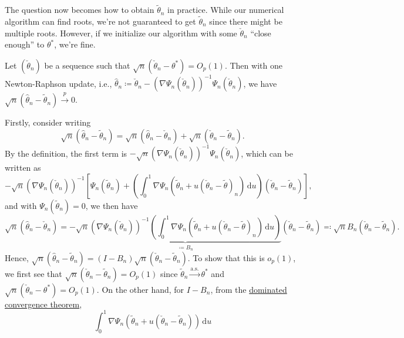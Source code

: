 The question now becomes how to obtain \(\widetilde{\theta} _n\) in practice. While our numerical algorithm can find roots, we're not guaranteed to get \(\widetilde{\theta} _n\) since there might be multiple roots. However, if we initialize our algorithm with some \(\check{\theta }_n\) ``close enough'' to \(\theta ^{\ast} \), we're fine.

\begin{claim}
	Let \((\check{\theta }_n)\) be a sequence such that \(\sqrt{n} (\check{\theta }_n - \theta ^{\ast} ) = O_p(1) \). Then with one Newton-Raphson update, i.e., \(\hat{\theta} _n \coloneqq \check{\theta }_n - \left( \nabla \Psi _n(\check{\theta }_n) \right) ^{-1} \Psi _n(\check{\theta }_n)\), we have \(\sqrt{n} (\hat{\theta} _n - \widetilde{\theta} _n) \overset{p}{\to} 0\).
\end{claim}
\begin{explanation}
	Firstly, consider writing
	\[
		\sqrt{n} (\hat{\theta} _n - \widetilde{\theta} _n)
		= \sqrt{n} (\hat{\theta} _n - \check{\theta }_n) + \sqrt{n} (\check{\theta }_n - \widetilde{\theta} _n).
	\]
	By the definition, the first term is \(- \sqrt{n} \left( \nabla \Psi _n(\check{\theta }_n) \right) ^{-1} \Psi _n(\check{\theta }_n) \), which can be written as
	\[
		- \sqrt{n} \left( \nabla \Psi _n(\check{\theta }_n) \right) ^{-1} \left[ \Psi _n(\widetilde{\theta} _n) + \left( \int_{0}^{1} \nabla \Psi _n(\widetilde{\theta} _n + u(\check{\theta }_n - \widetilde{\theta} )_n) \,\mathrm{d}u \right) (\check{\theta }_n - \widetilde{\theta} _n) \right],
	\]
	and with \(\Psi _n(\widetilde{\theta} _n) = 0\), we then have
	\[
		\sqrt{n} (\hat{\theta} _n - \check{\theta }_n)
		= - \sqrt{n} \underbrace{\left(\nabla \Psi _n (\check{\theta }_n)\right)^{-1} \left( \int_{0}^{1} \nabla \Psi _n(\widetilde{\theta} _n + u(\check{\theta }_n - \widetilde{\theta} )_n) \,\mathrm{d}u \right)}_{\coloneqq B_n} (\check{\theta }_n - \widetilde{\theta} _n)
		\eqqcolon \sqrt{n} B_n (\check{\theta }_n - \widetilde{\theta} _n).
	\]
	Hence, \(\sqrt{n} (\hat{\theta} _n - \widetilde{\theta} _n) = (I - B_n) \sqrt{n} (\check{\theta }_n - \widetilde{\theta} _n)\). To show that this is \(o_p(1)\), we first see that \(\sqrt{n} (\check{\theta }_n - \widetilde{\theta} _n) = O_p(1)\) since \(\widetilde{\theta} _n \overset{\text{a.s.} }{\to} \theta ^{\ast} \) and \(\sqrt{n} (\check{\theta }_n - \theta ^{\ast} ) = O_p(1)\). On the other hand, for \(I - B_n\), from  the \href{https://en.wikipedia.org/wiki/Dominated_convergence_theorem}{dominated convergence theorem},
	\[
		\int_{0}^{1} \nabla \Psi _n(\widetilde{\theta} _n + u(\check{\theta }_n - \widetilde{\theta} _n) ) \,\mathrm{d}u
\]
\end{explanation}
